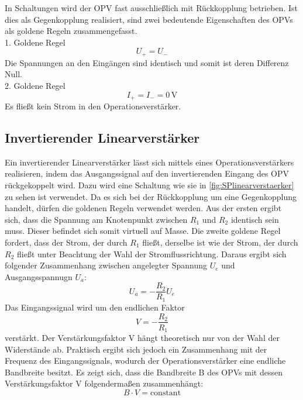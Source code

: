 In Schaltungen wird der OPV fast ausschließlich mit Rückkopplung betrieben.
Ist dies als Gegenkopplung realisiert, sind zwei bedeutende Eigenschaften des OPVs als goldene Regeln zusammengefasst.\\
1. Goldene Regel\\
\begin{equation} 
U_+ = U_- 
\end{equation} 
Die Spannungen an den Eingängen sind identisch und somit ist deren Differenz Null.\\
2. Goldene Regel\\
\begin{equation}
I_+ = I_- = 0\,\text{V}
\end{equation} 
Es fließt kein Strom in den Operationsverstärker.




\subsection{Invertierender Linearverstärker}\label{thlinearv}

Ein invertierender Linearverstärker lässt sich mittels eines Operationsverstärkers realisieren, indem das Ausgangssignal auf den invertierenden Eingang des OPV rückgekoppelt wird.
Dazu wird eine Schaltung wie sie in \autoref{fig:SPlinearverstaerker} zu sehen ist verwendet.
Da es sich bei der Rückkopplung um eine Gegenkopplung handelt, dürfen die goldenen Regeln verwendet werden.
Aus der ersten ergibt sich, dass die Spannung am Knotenpunkt zwischen $R_1$ und $R_2$ identisch sein muss. Dieser befindet sich somit virtuell auf Masse.
Die zweite goldene Regel fordert, dass der Strom, der durch $R_1$ fließt, derselbe ist wie der Strom, der durch $R_2$ fließt unter Beachtung der Wahl der Stromflussrichtung.
Daraus ergibt sich folgender Zusammenhang zwischen angelegter Spannung $U_e$ und Ausgangsspannugn $U_a$:
\begin{equation} 
U_a = -\frac{R_2}{R_1}U_e 
\end{equation} 
Das Eingangssignal wird um den endlichen Faktor
\begin{equation} 
V = -\frac{R_2}{R_1}
\end{equation}\label{eq:thverstaerkung}
verstärkt. Der Verstärkungsfaktor V hängt theoretisch nur von der Wahl der Widerstände ab.
Praktisch ergibt sich jedoch ein Zusammenhang mit der Frequenz des Eingangssignals, wodurch der Operationsverstärker eine endliche Bandbreite besitzt.
Es zeigt sich, dass die Bandbreite B des OPVs mit dessen Verstärkungsfaktor V folgendermaßen zusammenhängt:
\begin{equation} 
B \cdot V = \text{constant}
\end{equation}



